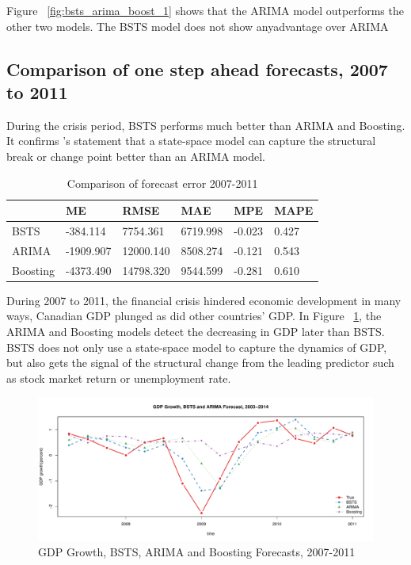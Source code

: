 Figure ~\ref{fig:bsts_arima_boost_1} shows that the ARIMA model outperforms the other two models. The BSTS model does not show anyadvantage over ARIMA 

 \subsection{Comparison of one step ahead forecasts, 2007 to 2011}
 
During the crisis period, BSTS performs much better than ARIMA and Boosting. It confirms  's statement that a state-space model can capture the structural break or change point better than an ARIMA model. 

\begin{table}[h]
	\centering
	\begin{tabular}{@{}llllll@{}}
		\toprule
				& ME     & RMSE   & MAE   & MPE  & MAPE   \\ \midrule
		BSTS    &  -384.114 & 7754.361 & 6719.998 & -0.023 & 0.427 \\
		ARIMA   & -1909.907 & 12000.140 & 8508.274 & -0.121 & 0.543 \\ 
		Boosting& -4373.490 & 14798.320 & 9544.599 & -0.281 & 0.610\\ \bottomrule
	\end{tabular}
	\caption{Comparison of forecast error 2007-2011}
	\label{ErrorCom2}
\end{table}

During 2007 to 2011, the financial crisis hindered economic development in many ways, Canadian GDP plunged as did other countries' GDP. In Figure ~\ref{fig:bsts_arima_boost2}, the ARIMA and Boosting models detect the decreasing in GDP later than BSTS. BSTS does not only use a state-space model to capture the dynamics of GDP, but also gets the signal of the structural change from the leading predictor such as stock market return or unemployment rate.  

\begin{figure}[h]
\centering
\includegraphics[width=0.9\linewidth]{Figures/bsts_arima_boost_2}
\caption{GDP Growth, BSTS, ARIMA and Boosting Forecasts, 2007-2011}
\label{fig:bsts_arima_boost2}
\end{figure}

